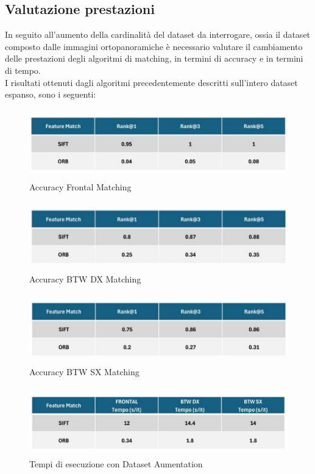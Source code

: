 \documentclass[12pt,a4paper,openright,twoside]{book}
\begin{document}
\subsection{Valutazione prestazioni}
In seguito all'aumento della cardinalità del dataset da interrogare, ossia il dataset composto dalle immagini ortopanoramiche è necessario valutare il cambiamento delle prestazioni degli algoritmi di matching, in termini di accuracy e in termini di tempo.\\
I risultati ottenuti dagli algoritmi precedentemente descritti sull'intero dataset espanso, sono i seguenti:
\begin{figure}[H]
	\centering
	\includegraphics[height=3cm,width=13cm]{figures/frontal1.pdf}
    	\caption{Accuracy Frontal Matching}
	\label{fig:frontal1}
\end{figure}
\begin{figure}[H]
	\centering
	\includegraphics[height=3cm,width=13cm]{figures/dx1.pdf}
   	\caption{Accuracy BTW DX Matching}
	\label{fig:dx1}
\end{figure}
\begin{figure}[H]
	\centering
	\includegraphics[height=3cm,width=13cm]{figures/sx1.pdf}
   	\caption{Accuracy BTW SX Matching}
	\label{fig:sx1}
\end{figure}
\begin{figure}[H]
	\centering
	\includegraphics[height=3cm,width=13cm]{figures/tempi1.pdf}
    	\caption{Tempi di esecuzione con Dataset Aumentation}
	\label{fig:tempi1}
\end{figure}
\end{document}
